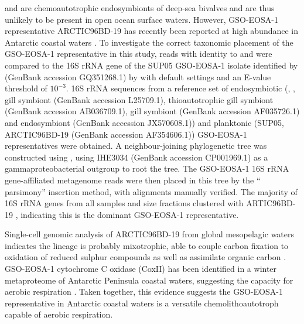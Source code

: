  and  are chemoautotrophic endosymbionts of deep-sea bivalves \cite{Kuwahara:2007gf,Newton:2007fu} and are thus unlikely to be present in open ocean surface waters. 
However, \ac{GSO-EOSA-1} representative ARCTIC96BD-19 has recently been reported at high abundance in Antarctic coastal waters \cite{Ghiglione:2011ee,Grzymski:2012ej}.
To investigate the correct taxonomic placement of the \ac{GSO-EOSA-1} representative in this study, reads with identity to  and  were compared to the 16S rRNA gene of the SUP05 \ac{GSO-EOSA-1} isolate identified by \citet{Walsh:2009fja} (GenBank accession GQ351268.1) by  with default settings and an E-value threshold of $10^{-3}$.
16S rRNA sequences from a reference set of endosymbiotic (, ,  gill symbiont (GenBank accession L25709.1),  thioautotrophic gill symbiont (GenBank accession AB036709.1),  gill symbiont (GenBank accession AF035726.1) and  endosymbiont (GenBank accession JX570608.1)) and planktonic (SUP05, ARCTIC96BD-19 (GenBank accession AF354606.1)) \ac{GSO-EOSA-1} representatives were obtained.
A neighbour-joining phylogenetic tree was constructed using  \cite{Ludwig:2004dg}, using  IHE3034 (GenBank accession CP001969.1) as a gammaproteobacterial outgroup to root the tree.
The \ac{GSO-EOSA-1} 16S rRNA gene-affiliated metagenome reads were then placed in this tree by the `` parsimony'' insertion method, with alignments manually verified.
The majority of 16S rRNA genes from all samples and size fractions clustered with ARTIC96BD-19 , indicating this is the dominant GSO-EOSA-1 representative. 



Single-cell genomic analysis of ARCTIC96BD-19 from global mesopelagic waters indicates the lineage is probably mixotrophic, able to couple carbon fixation to oxidation of reduced sulphur compounds as well as assimilate organic carbon \cite{Swan:2011hb}.
\ac{GSO-EOSA-1} cytochrome C oxidase (CoxII) has been identified in a winter metaproteome of Antarctic Peninsula coastal waters, suggesting the capacity for aerobic respiration \cite{Williams:2012bs}.
Taken together, this evidence suggests the \ac{GSO-EOSA-1} representative in Antarctic coastal waters is a versatile chemolithoautotroph capable of aerobic respiration.

